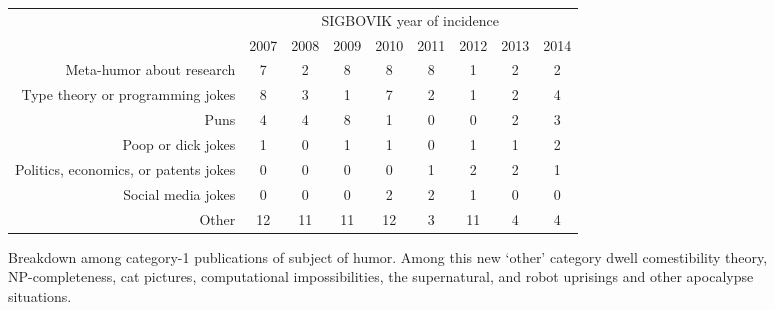 \documentclass[12pt]{article}
\begin{document}
\begin{figure}[h]
\begin{center}
\begin{tabular}{r|c|c|c|c|c|c|c|c|}
& \multicolumn{8}{c|}{SIGBOVIK year of incidence} \\
& 2007 & 2008 & 2009 & 2010 & 2011 & 2012 & 2013 & 2014 \\
\hline
\hline
Meta-humor about research
& 7  & 2  & 8  & 8  & 8  & 1  & 2  & 2  \\ \hline
Type theory or programming jokes
& 8  & 3  & 1  & 7  & 2  & 1  & 2  & 4  \\ \hline
Puns
& 4  & 4  & 8  & 1  & 0  & 0  & 2  & 3  \\ \hline
Poop or dick jokes
& 1  & 0  & 1  & 1  & 0  & 1  & 1  & 2  \\ \hline
Politics, economics, or patents jokes
& 0  & 0  & 0  & 0  & 1  & 2  & 2  & 1  \\ \hline
Social media jokes
& 0  & 0  & 0  & 2  & 2  & 1  & 0  & 0  \\ \hline
Other
& 12 & 11 & 11 & 12 & 3  & 11 & 4  & 4  \\ \hline

\end{tabular}
\end{center}
\caption{Breakdown among category-1 publications of subject of humor. Among this new `other' category dwell comestibility theory, NP-completeness, cat pictures, computational impossibilities, the supernatural, and robot uprisings and other apocalypse situations.}
\label{fig:results2}
\end{figure}
\end{document}
